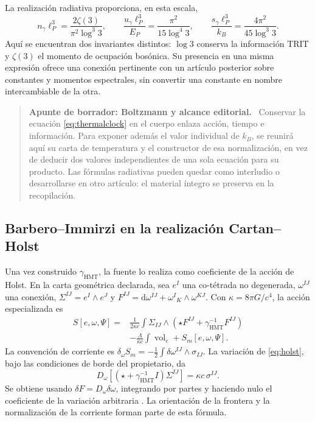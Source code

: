 \documentclass[11pt,a4paper]{article}
\numberwithin{equation}{section}
\theoremstyle{definition}
\newcommand{\HMT}{\mathrm{HMT}}
\newcommand{\dd}{\mathrm d}
\newenvironment{apunte}[1]{\par\Needspace{6\baselineskip}\smallskip
\begin{quote}\small\raggedright\color{ink}\noindent\textbf{Apunte de borrador: #1.}\ }
{\end{quote}\smallskip}
\begin{document}
La realización radiativa proporciona, en esta escala,
\[
n_\gamma\ell_P^3=\frac{2\zeta(3)}{\pi^2\log^3 3},\qquad
\frac{u_\gamma\ell_P^3}{E_P}
=\frac{\pi^2}{15\log^4 3},\qquad
\frac{s_\gamma\ell_P^3}{k_B}
=\frac{4\pi^2}{45\log^3 3}.
\]
Aquí se encuentran dos invariantes distintos: $\log3$ conserva la
información TRIT y $\zeta(3)$ el momento de ocupación bosónica.
Su presencia en una misma expresión ofrece una conexión pertinente
con un artículo posterior sobre constantes y momentos espectrales,
sin convertir una constante en nombre intercambiable de la otra.

\begin{apunte}{Boltzmann y alcance editorial}
Conservar la ecuación \eqref{eq:thermalclock} en el cuerpo enlaza acción,
tiempo e información. Para exponer además el valor individual de $k_B$,
se reunirá aquí su carta de temperatura y el constructor de esa
normalización, en vez de deducir dos valores independientes de una
sola ecuación para su producto. Las fórmulas radiativas pueden quedar
como interludio o desarrollarse en otro artículo: el material íntegro
se preserva en la recopilación.
\end{apunte}

\subsection{Barbero--Immirzi en la realización Cartan--Holst}
Una vez construido $\gamma_{\HMT}$, la fuente lo realiza como
coeficiente de la acción de Holst. En la carta geométrica declarada,
sea $e^I$ una co-tétrada no degenerada, $\omega^{IJ}$ una conexión,
$\Sigma^{IJ}=e^I\wedge e^J$ y
$F^{IJ}=\dd\omega^{IJ}+\omega^I{}_K\wedge\omega^{KJ}$.
Con $\kappa=8\pi G/c^4$, la acción especializada es
\begin{equation}
\begin{aligned}
S[e,\omega,\Psi]
={}&\frac1{2\kappa c}\int
\Sigma_{IJ}\wedge(\star F^{IJ}+\gamma_{\HMT}^{-1}F^{IJ})\\
&-\frac{\Lambda}{\kappa c}\int\operatorname{vol}_e
+S_m[e,\omega,\Psi].
\end{aligned}
\label{eq:holst}
\end{equation}
La convención de corriente es
$\delta_\omega S_m=-\tfrac12\int\delta\omega^{IJ}\wedge\sigma_{IJ}$.
La variación de \eqref{eq:holst}, bajo las condiciones de borde
del propietario, da
\[
D_\omega[(\star+\gamma_{\HMT}^{-1}I)\Sigma^{IJ}]
=\kappa c\,\sigma^{IJ}.
\]
Se obtiene usando $\delta F=D_\omega\delta\omega$, integrando por partes
y haciendo nulo el coeficiente de la variación arbitraria
\cite{holst}. La orientación de la frontera y la normalización
de la corriente forman parte de esta fórmula.
\end{document}
